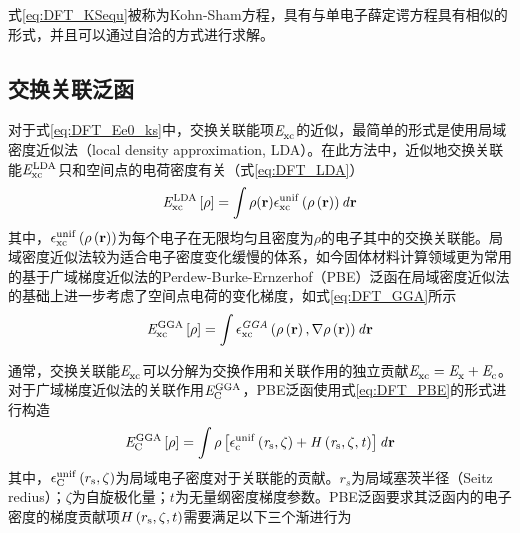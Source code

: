 式\eqref{eq:DFT_KSequ}被称为Kohn-Sham方程，具有与单电子薛定谔方程具有相似的形式，并且可以通过自洽的方式进行求解。

\subsection{交换关联泛函}

对于式\eqref{eq:DFT_Ee0_ks}中，交换关联能项$\it E_{\rm xc}^{\rm } \it$的近似，最简单的形式是使用局域密度近似法（local density approximation, LDA）。在此方法中，近似地交换关联能$\it E_{\rm xc}^{\rm LDA} \it$只和空间点的电荷密度有关（式\eqref{eq:DFT_LDA}）\chinesecolon
\begin{equation}
    \label{eq:DFT_LDA}
    \it E_{\rm xc}^{\rm LDA} \it\left[\rho\right]=\int \rho({\mathbf r}) \epsilon_{\rm xc}^{\rm unif} \left(\rho\left({\mathbf r}\right)\right) d{\mathbf r}
\end{equation}
其中，$\epsilon_{\rm xc}^{\rm unif}\left(\rho\left({\mathbf r}\right)\right)$为每个电子在无限均匀且密度为$\rho$的电子其中的交换关联能。局域密度近似法较为适合电子密度变化缓慢的体系，如今固体材料计算领域更为常用的基于广域梯度近似法的Perdew-Burke-Ernzerhof（PBE）泛函在局域密度近似法的基础上进一步考虑了空间点电荷的变化梯度，如式\eqref{eq:DFT_GGA}所示\chinesecolon
\begin{equation}
    \label{eq:DFT_GGA}
    \it E_{\rm xc}^{\rm GGA} \it\left[\rho\right]=\int\epsilon_{\rm xc}^{GGA}\left(\rho\left({\mathbf r}\right),\nabla\rho\left({\mathbf r}\right)\right)d{\mathbf r}
\end{equation}

通常，交换关联能$\it E_{\rm xc}^{\rm } \it$可以分解为交换作用和关联作用的独立贡献\chinesecolon $\it E_{\rm xc}^{\rm } \it=\it E_{\rm x}^{\rm } \it+\it E_{\rm c}^{\rm } \it$。对于广域梯度近似法的关联作用$\it E_{\rm C}^{\rm GGA} \it$，PBE泛函使用式\eqref{eq:DFT_PBE}的形式进行构造\chinesecolon
\begin{equation}
    \label{eq:DFT_PBE}
    \it E_{\rm C}^{\rm GGA} \it\left[\rho\right]=\int \rho\left[\epsilon_{\rm c}^{\rm unif}\left(r_{\rm s},\zeta\right)+H\left(r_{\rm s},\zeta,t\right)\right] d{\mathbf r}
\end{equation}
其中，$\epsilon_{\rm C}^{\rm unif}\left(r_{\rm s},\zeta\right)$为局域电子密度对于关联能的贡献。$r_s$为局域塞茨半径（Seitz redius）；$\zeta$为自旋极化量；$t$为无量纲密度梯度参数。PBE泛函要求其泛函内的电子密度的梯度贡献项$H\left(r_{\rm s},\zeta,t\right)$需要满足以下三个渐进行为\chinesecolon

